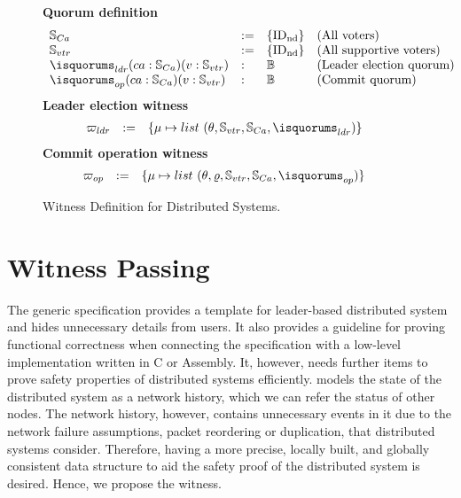 \begin{figure}
\raggedright
\textbf{Quorum definition}  \\
$$
\begin{array}{llll}
\accsset & := & \set{\nodeid} & \mbox{(All voters)}\\
\voters & := & \set{\nodeid} & \mbox{(All supportive voters)}\\
\isquorums_{ldr} (ca: \accsset) (v: \voters) &:& \mathbb{B} & \mbox{(Leader election quorum)} \\
\isquorums_{op} (ca: \accsset) (v: \voters)  &:&  \mathbb{B} &  \mbox{(Commit quorum)}\\
\end{array}
$$
\textbf{Leader election witness}  \\
$$
\begin{array}{llll}
\ldrwitness &:=&  \set{\termnum \mapsto list\ (\dstate, \voters, \accsset, \isquorums_{ldr})} & \\
\end{array}
$$
\textbf{Commit operation witness}  \\
$$
\begin{array}{llll}
\opwitness &:=& \set{\termnum \mapsto list\ (\dstate, \updatefunc, \voters,
	\accsset, \isquorums_{op})}& 
\end{array}
$$
\caption{Witness Definition for Distributed Systems.}
\label{fig:chapter:witnesspassing:witness-definition}
\end{figure}

\section{Witness Passing}
\label{chapter:witnesspassing:sec:witness-passing}

The generic specification provides a template for leader-based distributed
system and hides unnecessary details from users. It also provides a guideline 
for proving functional correctness when connecting the specification with a 
low-level implementation written in C or Assembly.
It, however, needs further items to prove safety properties of distributed 
systems efficiently.  
\sysname{} models the state of the distributed system as a network history, 
which we can refer the status of other nodes.
The network history, however, contains unnecessary events in it due to
the network failure assumptions, packet reordering or duplication, that  
distributed systems consider. Therefore, having a more precise, 
locally built, and globally consistent data structure to aid the safety proof 
of the distributed system is desired. Hence, we propose the witness.   

